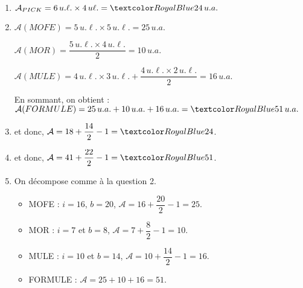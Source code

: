         
        \begin{enumerate}
            \item $\mathcal{A}_{PICK} =6\,u.\ell.\times4\,u\ell. =\cor{24\,u.a.}$
            \item $\mathcal{A}(MOFE) =5\,u.\ell.\times5\,u.\ell. =25\,u.a.$ \par \smallskip
                $\mathcal{A}(MOR) =\dfrac{5\,u.\ell.\times4\,u.\ell.}{2} =10\,u.a.$ \par \smallskip
                $\mathcal{A}(MULE) =4\,u.\ell.\times3\,u.\ell.+\dfrac{4\,u.\ell.\times2\,u.\ell.}{2} =16\,u.a.$ \par \smallskip
                En sommant, on obtient : $\mathcal{A}(FORMULE) =25\,u.a.+10\,u.a.+16\,u.a. =\cor{51\,u.a.}$ \smallskip
            \item {} et  donc, $\mathcal{A} =18+\dfrac{14}{2}-1 =\cor{24}$. \smallskip
            \item {} et  donc, $\mathcal{A} =41+\dfrac{22}{2}-1 =\cor{51}$. \smallskip
            \item On décompose comme à la question 2.
                \begin{itemize}
                    \item MOFE : $i =16$, $b =20$, $\mathcal{A} =16+\dfrac{20}{2}-1 =25$. \smallskip
                    \item MOR : $i =7$ et $b =8$, $\mathcal{A} =7+\dfrac{8}{2}-1 =10$. \smallskip
                    \item MULE : $i =10$ et $b =14$, $\mathcal{A} =10+\dfrac{14}{2}-1 =16$. \smallskip
                    \item FORMULE : $\mathcal{A} =25+10+16 =51$. \par
            \end{itemize}
        \end{enumerate}

\vfill



